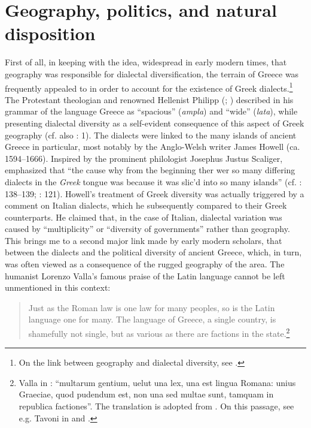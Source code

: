 \section{Geography, politics, and natural disposition}\label{sec:7.5}


First of all, in keeping with the idea, widespread in early modern times, that geography was responsible for dialectal diversification, the terrain of Greece was frequently appealed to in order to account for the existence of Greek dialects.\footnote{On the link between geography and dialectal diversity, see \citet[]{VanRooyFcd}.} The Protestant theologian and renowned Hellenist Philipp \citeauthor{Melanchthon1518} (\citeyear[a.1\textsc{\textsuperscript{v}}]{Melanchthon1518}; \citeyear[\textsc{a.}i\textsc{\textsuperscript{v}}]{Melanchthon1520}) described in his grammar of the language Greece as “spacious” (\textit{ampla}) and “wide” (\textit{lata}), while presenting dialectal diversity as a self-evident consequence of this aspect of Greek geography (cf. also \citealt{Ruland1556}: 1). The dialects were linked to the many islands of ancient Greece in particular, most notably by the Anglo-Welsh writer James Howell (ca. 1594–1666). Inspired by the prominent philologist Josephus Justus Scaliger, \citet[89]{Howell1650b} emphasized that “the cause why from the beginning ther wer so many differing dialects in the \textit{Greek} tongue was because it was slic’d into so many islands” (cf. \citealt{Howell1642}: 138–139; \citealt{Scaliger1610}: 121). Howell’s treatment of Greek diversity was actually triggered by a comment on Italian dialects, which he subsequently compared to their Greek counterparts. He claimed that, in the case of Italian, dialectal variation was caused by “multiplicity” or “diversity of governments” rather than geography. This brings me to a second major link made by early modern scholars, that between the dialects and the political diversity of ancient Greece, which, in turn, was often viewed as a consequence of the rugged geography of the area. The humanist Lorenzo Valla’s famous praise of the Latin language cannot be left unmentioned in this context:

\begin{quote}
Just as the Roman law is one law for many peoples, so is the Latin language one for many. The language of Greece, a single country, is shamefully not single, but as various as there are factions in the state.\footnote{Valla in \citet[122]{Regoliosi1993}: “multarum gentium, uelut una lex, una est lingua Romana: unius Graeciae, quod pudendum est, non una sed multae sunt, tamquam in republica factiones”. The translation is adopted from \citet[10]{Trapp1990}. On this passage, see e.g. Tavoni in \citet[90 n.55]{Benvoglienti1975} and \citet[212--213]{Trovato1984}.}
\end{quote}

